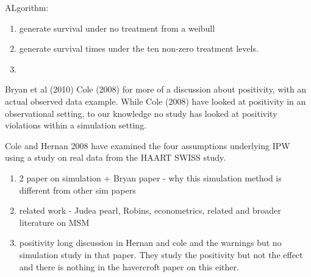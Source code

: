 \documentclass[11pt]{article}
\providecommand{\tightlist}{%
      \setlength{\itemsep}{0pt}\setlength{\parskip}{0pt}}
\begin{document}
ALgorithm:

\begin{enumerate}
\def\labelenumi{\arabic{enumi}.}
\item
  generate survival under no treatment from a weibull
\item
  generate survival times under the ten non-zero treatment levels.
\item
\end{enumerate}

Bryan et al (2010) Cole (2008) for more of a discussion about
positivity, with an actual observed data example. While Cole (2008) have
looked at positivity in an observational setting, to our knowledge no
study has looked at positivity violations within a simulation setting.

Cole and Hernan 2008 have examined the four assumptions underlying IPW
using a study on real data from the HAART SWISS study.

\begin{enumerate}
\def\labelenumi{\arabic{enumi}.}
\tightlist
\item
  2 paper on simulation + Bryan paper - why this simulation method is
  different from other sim papers
\item
  related work - Judea pearl, Robins, econometrics, related and broader
  literature on MSM
\item
  positivity long discussion in Hernan and cole and the warnings but no
  simulation study in that paper. They study the positivity but not the
  effect and there is nothing in the havercroft paper on this either.
\end{enumerate}
\end{document}
